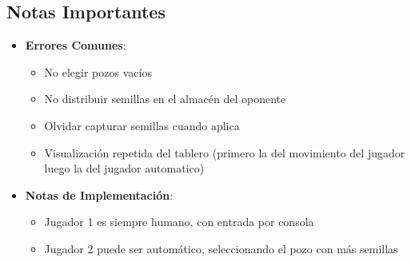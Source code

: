 \documentclass{article}
\begin{document}
\subsection{Notas Importantes}
\begin{itemize}
    \item \textbf{Errores Comunes}:
    \begin{itemize}
        \item No elegir pozos vacíos
        \item No distribuir semillas en el almacén del oponente
        \item Olvidar capturar semillas cuando aplica
        \item Visualización repetida del tablero (primero la del movimiento del jugador luego la del jugador automatico)
    \end{itemize}
    \item \textbf{Notas de Implementación}:
    \begin{itemize}
        \item Jugador 1 es siempre humano, con entrada por consola
        \item Jugador 2 puede ser automático, seleccionando el pozo con más semillas
    \end{itemize}
\end{itemize}
\end{document}
